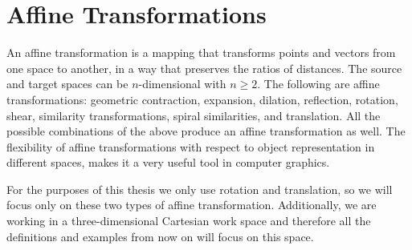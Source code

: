 \section{Affine Transformations}
An affine transformation is a mapping that transforms points and vectors from one space to another, in a way that preserves the ratios of distances. The source and target spaces can be $n$-dimensional with $n\ge2$. The following are affine transformations: geometric contraction, expansion, dilation, reflection, rotation, shear, similarity transformations, spiral similarities, and translation. All the possible combinations of the above produce an affine transformation as well. The flexibility of affine transformations with respect to object representation in different spaces, makes it a very useful tool in computer graphics.

For the purposes of this thesis we only use rotation and translation, so we will focus only on these two types of affine transformation. Additionally, we are working in a three-dimensional Cartesian work space and therefore all the definitions and examples from now on will focus on this space.

